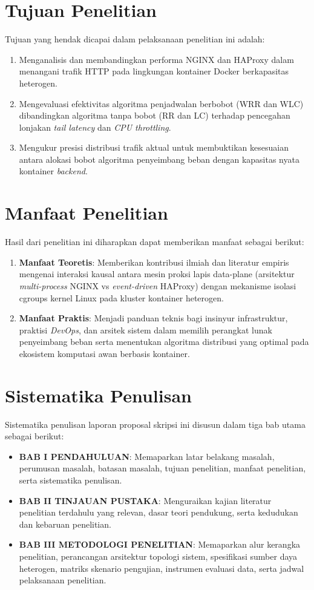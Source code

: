 \section{Tujuan Penelitian}
Tujuan yang hendak dicapai dalam pelaksanaan penelitian ini adalah:
\begin{enumerate}
    \item Menganalisis dan membandingkan performa NGINX dan HAProxy dalam menangani trafik HTTP pada lingkungan kontainer Docker berkapasitas heterogen.
    \item Mengevaluasi efektivitas algoritma penjadwalan berbobot (WRR dan WLC) dibandingkan algoritma tanpa bobot (RR dan LC) terhadap pencegahan lonjakan \textit{tail latency} dan \textit{CPU throttling}.
    \item Mengukur presisi distribusi trafik aktual untuk membuktikan kesesuaian antara alokasi bobot algoritma penyeimbang beban dengan kapasitas nyata kontainer \textit{backend}.
\end{enumerate}

\section{Manfaat Penelitian}
Hasil dari penelitian ini diharapkan dapat memberikan manfaat sebagai berikut:
\begin{enumerate}
    \item \textbf{Manfaat Teoretis}: Memberikan kontribusi ilmiah dan literatur empiris mengenai interaksi kausal antara mesin proksi lapis data-plane (arsitektur \textit{multi-process} NGINX vs \textit{event-driven} HAProxy) dengan mekanisme isolasi cgroups kernel Linux pada kluster kontainer heterogen.
    \item \textbf{Manfaat Praktis}: Menjadi panduan teknis bagi insinyur infrastruktur, praktisi \textit{DevOps}, dan arsitek sistem dalam memilih perangkat lunak penyeimbang beban serta menentukan algoritma distribusi yang optimal pada ekosistem komputasi awan berbasis kontainer.
\end{enumerate}

\section{Sistematika Penulisan}
Sistematika penulisan laporan proposal skripsi ini disusun dalam tiga bab utama sebagai berikut:
\begin{itemize}
    \item \textbf{BAB I PENDAHULUAN}: Memaparkan latar belakang masalah, perumusan masalah, batasan masalah, tujuan penelitian, manfaat penelitian, serta sistematika penulisan.
    \item \textbf{BAB II TINJAUAN PUSTAKA}: Menguraikan kajian literatur penelitian terdahulu yang relevan, dasar teori pendukung, serta kedudukan dan kebaruan penelitian.
    \item \textbf{BAB III METODOLOGI PENELITIAN}: Memaparkan alur kerangka penelitian, perancangan arsitektur topologi sistem, spesifikasi sumber daya heterogen, matriks skenario pengujian, instrumen evaluasi data, serta jadwal pelaksanaan penelitian.
\end{itemize}
